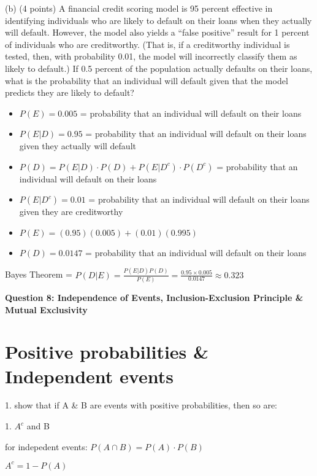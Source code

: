 \documentclass{article}
\begin{document}
(b) (4 points) A financial credit scoring model is 95 percent effective in identifying individuals who
are likely to default on their loans when they actually will default. However, the model also yields a
“false positive” result for 1 percent of individuals who are creditworthy. (That is, if a creditworthy
individual is tested, then, with probability 0.01, the model will incorrectly classify them as likely
to default.) If 0.5 percent of the population actually defaults on their loans, what is the probability
that an individual will default given that the model predicts they are likely to default?

\begin{itemize}
    \item \(P(E) = 0.005\) = probability that an individual will default on their loans
    \item \(P(E|D) = 0.95\) = probability that an individual will default on their loans given they actually will default
    \item \(P(D) = P(E|D) \cdot P(D) + P(E|D^c) \cdot P(D^c)\) = probability that an individual will default on their loans
    \item \(P(E|D^c) = 0.01\) = probability that an individual will default on their loans given they are creditworthy
    \item \(P(E) = (0.95)(0.005) + (0.01)(0.995)\)
    \item \(P(D) = 0.0147\) = probability that an individual will default on their loans
\end{itemize}

Bayes Theorem = \(P(D|E) = \frac{P(E|D)P(D)}{P(E)} = \frac{0.95 \times 0.005}{0.0147} \approx 0.323\)

\begin{center}
    \large \textbf{Question 8: Independence of Events, Inclusion-Exclusion Principle \& Mutual Exclusivity}
\end{center}

\section{Positive probabilities \& Independent events}
1. show that if A \& B are events with positive probabilities, then so are:

1. \(A^c\) and B 

for indepedent events: \(P(A \cap B) = P(A) \cdot P(B)\)\newline

\(A^c = 1-P(A)\)
\end{document}
